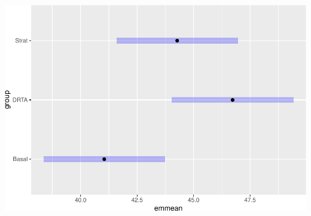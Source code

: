 \documentclass[
]{article}
\begin{document}
\includegraphics{emmeansNotes_files/figure-latex/unnamed-chunk-5-2.pdf}
\end{document}
